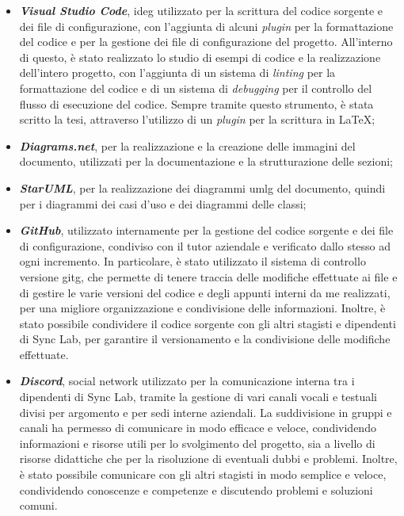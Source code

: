 \begin{itemize}
    \item{\textit{\textbf{Visual Studio Code}}}, \gls{ideg} utilizzato per la scrittura del codice sorgente e dei file di configurazione, con l'aggiunta di alcuni \textit{plugin} per la formattazione del codice e per la gestione dei file di configurazione 
    del progetto. All'interno di questo, è stato realizzato lo studio di esempi di codice e la realizzazione dell'intero progetto, con l'aggiunta di un sistema di \textit{linting} per la formattazione del codice e di un sistema di \textit{debugging} per il controllo del flusso di esecuzione del codice.
    Sempre tramite questo strumento, è stata scritto la tesi, attraverso l'utilizzo di un \textit{plugin} per la scrittura in \LaTeX;
    
    \item{\textit{\textbf{Diagrams.net}}}, per la realizzazione e la creazione delle immagini del documento, utilizzati per la documentazione e la strutturazione delle sezioni;
    
    \item{\textit{\textbf{StarUML}}}, per la realizzazione dei diagrammi \gls{umlg} del documento, quindi per i diagrammi dei casi d'uso e dei diagrammi delle classi;

    \item{\textit{\textbf{GitHub}}}, utilizzato internamente per la gestione del codice sorgente e dei file di configurazione, condiviso con il tutor aziendale e verificato dallo stesso ad ogni incremento.
    In particolare, è stato utilizzato il sistema di controllo versione \gls{gitg}, che permette di tenere traccia delle modifiche effettuate ai file e di gestire le varie versioni del codice e degli appunti interni 
    da me realizzati, per una migliore organizzazione e condivisione delle informazioni. Inoltre, è stato possibile condividere il codice sorgente con gli altri stagisti e dipendenti di Sync Lab,
    per garantire il versionamento e la condivisione delle modifiche effettuate.
    
    \item{\textit{\textbf{Discord}}}, social network utilizzato per la comunicazione interna tra i dipendenti di Sync Lab, 
    tramite la gestione di vari canali vocali e testuali divisi per argomento e per sedi interne aziendali. La suddivisione in gruppi e canali
    ha permesso di comunicare in modo efficace e veloce, condividendo informazioni e risorse utili per lo svolgimento del progetto, sia a livello di risorse 
    didattiche che per la risoluzione di eventuali dubbi e problemi. Inoltre, è stato possibile comunicare con gli altri stagisti in modo semplice e veloce,
    condividendo conoscenze e competenze e discutendo problemi e soluzioni comuni.
\end{itemize}

